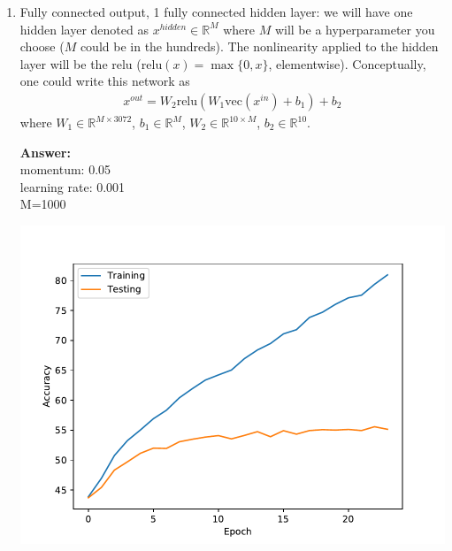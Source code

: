 \documentclass{article}
\newcommand{\field}[1]{\mathbb{#1}}
\newcommand{\1}{\mathbf{1}}
\newcommand{\R}{\field{R}} %
\def\vec{\text{vec}}
\begin{document}
\begin{enumerate}
  \item Fully connected output, 1 fully connected hidden layer: we will have one hidden layer denoted as $x^{hidden} \in \R^{M}$ where $M$ will be a hyperparameter you choose ($M$ could be in the hundreds). The nonlinearity applied to the hidden layer will be the relu ($\mathrm{relu}(x) = \max\{0,x\}$, elementwise). Conceptually, one could write this network as 
  \begin{align*}
  x^{out} = W_2 \mathrm{relu}(W_1 \vec(x^{in}) +b_1) + b_2
  \end{align*}
  where $W_1 \in \R^{M \times 3072}$, $b_1 \in \R^M$, $W_2 \in \R^{10 \times M}$, $b_2 \in \R^{10}$.
  
  \textbf{Answer:}\\
  momentum: 0.05\\
  learning rate: 0.001\\
  M=1000
  
  \includegraphics[]{3_singHid.pdf}
  

\end{enumerate}
\end{document}
